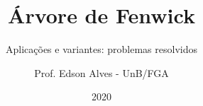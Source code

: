 \title{Árvore de Fenwick}
\subtitle{Aplicações e variantes: problemas resolvidos}
\author{Prof. Edson Alves - UnB/FGA}
\date{2020}
